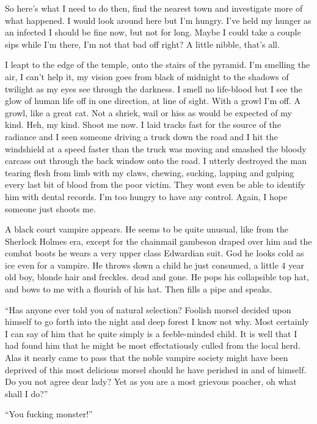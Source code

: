 So here's what I need to do then, find the nearest town and investigate more of what happened. I would look around here but I'm hungry. I've held my hunger as an infected I should be fine now, but not for long. Maybe I could take a couple sips while I'm there, I'm not that bad off right? A little nibble, that's all.

I leapt to the edge of the temple, onto the stairs of the pyramid. I'm smelling the air, I can't help it, my vision goes from black of midnight to the shadows of twilight as my eyes see through the darkness. I smell no life-blood but I see the glow of human life off in one direction, at line of sight. With a growl I'm off. A growl, like a great cat. Not a shriek, wail or hiss as would be expected of my kind. Heh, my kind. Shoot me now. I laid tracks fast for the source of the radiance and I seen someone driving a truck down the road and I hit the windshield at a speed faster than the truck was moving and smashed the bloody carcass out through the back window onto the road. I utterly destroyed the man tearing flesh from limb with my claws, chewing, sucking, lapping and gulping every last bit of blood from the poor victim. They wont even be able to identify him with dental records. I'm too hungry to have any control. Again, I hope someone just shoots me.

A black court vampire appears. He seems to be quite unusual, like from the Sherlock Holmes era, except for the chainmail gambeson draped over him and the combat boots he wears a very upper class Edwardian suit. God he looks cold as ice even for a vampire. He throws down a child he just consumed, a little 4 year old boy, blonde hair and freckles. dead and gone. He pops his collapsible top hat, and bows to me with a flourish of his hat. Then fills a pipe and speaks.

``Has anyone ever told you of natural selection? Foolish morsel decided upon himself to go forth into the night and deep forest I know not why. Most certainly I can say of him that he quite simply is a feeble-minded child. It is well that I had found him that he might be most effectatiously culled from the local herd. Alas it nearly came to pass that the noble vampire society might have been deprived of this most delicious morsel should he have perished in and of himself. Do you not agree dear lady? Yet as you are a most grievous poacher, oh what shall I do?''

``You fucking monster!''

